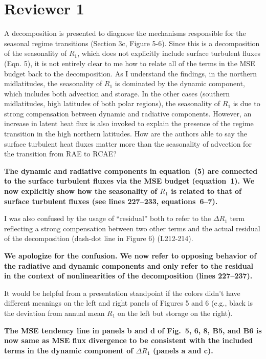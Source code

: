 \documentclass{article}
\begin{document}
\section*{Reviewer 1}
A decomposition is presented to diagnose the mechanisms responsible for the seasonal regime transitions (Section 3c, Figure 5-6). Since this is a decomposition of the seasonality of $R_1$, which does not explicitly include surface turbulent fluxes (Eqn. 5), it is not entirely clear to me how to relate all of the terms in the MSE budget back to the decomposition. As I understand the findings, in the northern midlatitudes, the seasonality of $R_1$ is dominated by the dynamic component, which includes both advection and storage. In the other cases (southern midlatitudes, high latitudes of both polar regions), the seasonality of $R_1$ is due to strong compensation between dynamic and radiative components. However, an increase in latent heat flux is also invoked to explain the presence of the regime transition in the high northern latitudes. How are the authors able to say the surface turbulent heat fluxes matter more than the seasonality of advection for the transition from RAE to RCAE?

\textbf{The dynamic and radiative components in equation~(5) are connected to the surface turbulent fluxes via the MSE budget (equation~1). We now explicitly show how the seasonality of $R_1$ is related to that of surface turbulent fluxes (see lines 227--233, equations~6--7). }

I was also confused by the usage of ``residual'' both to refer to the $\Delta R_1$ term reflecting a strong compensation between two other terms and the actual residual of the decomposition (dash-dot line in Figure 6) (L212-214).

\textbf{We apologize for the confusion. We now refer to opposing behavior of the radiative and dynamic components and only refer to the residual in the context of nonlinearities of the decomposition (lines 227--237).}

It would be helpful from a presentation standpoint if the colors didn't have different meanings on the left and right panels of Figures 5 and 6 (e.g., black is the deviation from annual mean $R_1$ on the left but storage on the right).

\textbf{The MSE tendency line in panels b and d of Fig.~5, 6, 8, B5, and B6 is now same as MSE flux divergence to be consistent with the included terms in the dynamic component of $\Delta R_1$ (panels a and c).}
\end{document}
